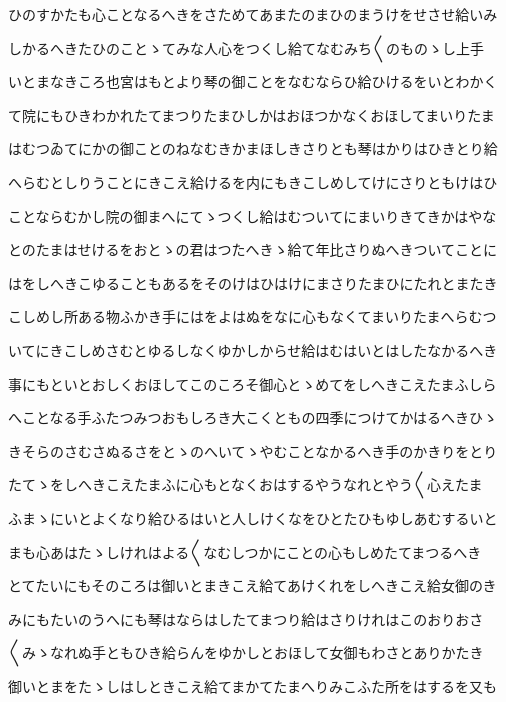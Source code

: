 \documentclass[a4paper,11pt,landscape]{ltjtarticle}
\begin{document}
\par\medskip
ひのすかたも心ことなるへきをさためてあまたのまひのまうけをせさせ給いみ
\par\medskip
しかるへきたひのことゝてみな人心をつくし給てなむみち〱のものゝし上手
\par\medskip
いとまなきころ也宮はもとより琴の御ことをなむならひ給ひけるをいとわかく
\par\medskip
て院にもひきわかれたてまつりたまひしかはおほつかなくおほしてまいりたま
\par\medskip
はむつゐてにかの御ことのねなむきかまほしきさりとも琴はかりはひきとり給
\par\medskip
へらむとしりうことにきこえ給けるを内にもきこしめしてけにさりともけはひ
\par\medskip
ことならむかし院の御まへにてゝつくし給はむついてにまいりきてきかはやな
\par\medskip
とのたまはせけるをおとゝの君はつたへきゝ給て年比さりぬへきついてことに
\par\medskip
はをしへきこゆることもあるをそのけはひはけにまさりたまひにたれとまたき
\par\medskip
こしめし所ある物ふかき手にはをよはぬをなに心もなくてまいりたまへらむつ
\par\medskip
いてにきこしめさむとゆるしなくゆかしからせ給はむはいとはしたなかるへき
\par\medskip
事にもといとおしくおほしてこのころそ御心とゝめてをしへきこえたまふしら
\par\medskip
へことなる手ふたつみつおもしろき大こくともの四季につけてかはるへきひゝ
\par\medskip
きそらのさむさぬるさをとゝのへいてゝやむことなかるへき手のかきりをとり
\par\medskip
たてゝをしへきこえたまふに心もとなくおはするやうなれとやう〱心えたま
\par\medskip
ふまゝにいとよくなり給ひるはいと人しけくなをひとたひもゆしあむするいと
\par\medskip
まも心あはたゝしけれはよる〱なむしつかにことの心もしめたてまつるへき
\par\medskip
とてたいにもそのころは御いとまきこえ給てあけくれをしへきこえ給女御のき
\par\medskip
みにもたいのうへにも琴はならはしたてまつり給はさりけれはこのおりおさ
\par\medskip
〱みゝなれぬ手ともひき給らんをゆかしとおほして女御もわさとありかたき
\par\medskip
御いとまをたゝしはしときこえ給てまかてたまへりみこふた所をはするを又も
\par\medskip
\end{document}
